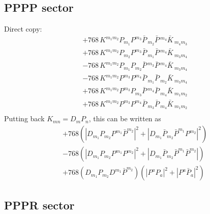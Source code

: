 \subsection{PPPP sector}
Direct copy:
\begin{align}
&+768\,K^{{m_{1}} {m_{2}}} P_{{m_{1}}} P^{{m_{3}}} \bar{P}\,_{{m_{2}}} \bar{P}\,^{{m_{4}}} \bar{K}\,_{{m_{4}} {m_{3}}}\\
&+768\,K^{{m_{1}} {m_{2}}} P_{{m_{2}}} P^{{m_{3}}} \bar{P}\,_{{m_{1}}} \bar{P}\,^{{m_{4}}} \bar{K}\,_{{m_{3}} {m_{4}}}\\
&-768\,K^{{m_{1}} {m_{2}}} P_{{m_{1}}} P_{{m_{2}}} \bar{P}\,^{{m_{3}}} \bar{P}\,^{{m_{4}}} \bar{K}\,_{{m_{3}} {m_{4}}}\\
&-768\,K^{{m_{1}} {m_{2}}} P^{{m_{3}}} P^{{m_{4}}} \bar{P}\,_{{m_{1}}} \bar{P}\,_{{m_{2}}} \bar{K}\,_{{m_{3}} {m_{4}}}\\
&+768\,K^{{m_{1}} {m_{2}}} P^{{m_{3}}} P_{{m_{3}}} \bar{P}\,^{{m_{4}}} \bar{P}\,_{{m_{4}}} \bar{K}\,_{{m_{1}} {m_{2}}}\\
&+768\,K^{{m_{1}} {m_{2}}} P^{{m_{3}}} P^{{m_{4}}} \bar{P}\,_{{m_{3}}} \bar{P}\,_{{m_{4}}} \bar{K}\,_{{m_{1}} {m_{2}}}\\
\end{align}
Putting back $K_{mn} = D_m P_n$, this can be written as
\begin{align}
&+768( |D_{m_1} P_{m_2} P^{m_1}\bar{P}^{m_2}|^2+|D_{m_1} \bar{P}_{m_2} \bar{P}^{m_1}P^{m_2}|^2)\\
&-768( |D_{m_1}P_{m_2} P^{m_1}P^{m_2}|^2 + |D_{m_1}\bar{P}_{m_2} \bar{P}^{m_1}\bar{P}^{m_2}|)\\
&+768( D_{m_1}P_{m_2} D^{m_1}\bar{P}^{m_2})(|P^a P_a|^2 + |P^a\bar{P}_a|^2)
\end{align}

\subsection{PPPR sector}

